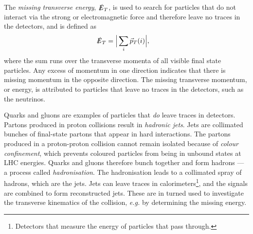 \documentclass[twoside,english]{uiofysmaster}
\begin{document}
{The \textit{missing transverse energy}, $\slashed{E}_T$, is used to search for particles that do not interact via the strong or electromagnetic force and therefore leave no traces in the detectors, and is defined as
\begin{align}\label{Eq:: susy hadron : Missing energy}
\slashed{E}_T &= \Big| \sum_i \vec{p}_T (i)\Big| ,
\end{align} 
where the sum runs over the transverse momenta of all visible final state particles.  Any excess of momentum in one direction indicates that there is missing momentum in the opposite direction. The missing transverse momentum, or energy, is attributed to particles that leave no traces in the detectors, such as the neutrinos.  


Quarks and gluons are examples of particles that \textit{do} leave traces in detectors. Partons produced in proton collisions result in \textit{hadronic jets}. Jets are collimated bunches of final-state partons that appear in hard interactions. The partons produced in a proton-proton collision cannot remain isolated because of \textit{colour confinement}, which prevents coloured particles from being in unbound states at LHC energies. Quarks and gluons therefore bunch together and form hadrons --- a process called \textit{hadronisation}. The hadronisation leads to a collimated spray of hadrons, which are the jets. Jets can leave traces in calorimeters\footnote{Detectors that measure the energy of particles that pass through.}, and the signals are combined to form reconstructed jets. These are in turned used to investigate the transverse kinematics of the collision, \textit{e.g.} by determining the missing energy. 





}
\end{document}
